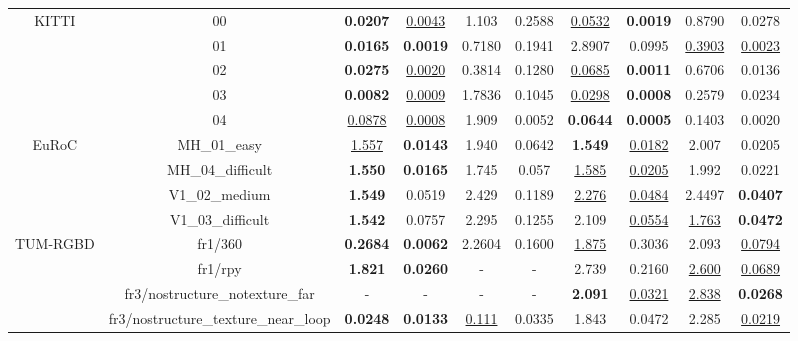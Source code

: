 \begin{table*}[ht!]
{\begin{tabular}{cccccccccc}
\multirow{4}{*}{KITTI \cite{dataset:kitti}} 
                                & 00       & \textbf{0.0207} & \underline{0.0043} & 1.103 & 0.2588 & \underline{0.0532} & \textbf{0.0019} & 0.8790 & 0.0278 \\
                                & 01       & \textbf{0.0165} & \textbf{0.0019} & 0.7180 & 0.1941   & 2.8907  & 0.0995 & \underline{0.3903} & \underline{0.0023}  \\
                                & 02       & \textbf{0.0275} & \underline{0.0020}  &  0.3814  & 0.1280   & \underline{0.0685}  & \textbf{0.0011} & 0.6706  & 0.0136  \\
                                & 03       & \textbf{0.0082} & \underline{0.0009}    & 1.7836 & 0.1045   & \underline{0.0298}  & \textbf{0.0008} & 0.2579  & 0.0234  \\
                                & 04       & \underline{0.0878} & \underline{0.0008}    &  1.909  & 0.0052   & \textbf{0.0644}  & \textbf{0.0005} & 0.1403 & 0.0020  \\
\midrule
\multirow{4}{*}{EuRoC \cite{dataset:burri2016euroc}} 
                                & MH\_01\_easy       & \underline{1.557} & \textbf{0.0143} &  1.940  & 0.0642 & \textbf{1.549}  & \underline{0.0182} & 2.007  & 0.0205  \\
                                & MH\_04\_difficult  & \textbf{1.550} & \textbf{0.0165}  &  1.745  & 0.057  & \underline{1.585}  & \underline{0.0205} & 1.992  & 0.0221  \\
                                & V1\_02\_medium     & \textbf{1.549} & 0.0519  &  2.429  & 0.1189  & \underline{2.276}  & \underline{0.0484} & 2.4497  & \textbf{0.0407} \\
                                & V1\_03\_difficult  & \textbf{1.542} & 0.0757  &  2.295  & 0.1255   & 2.109  & \underline{0.0554} & \underline{1.763}  & \textbf{0.0472}  \\
\midrule
\multirow{4}{*}{TUM-RGBD \cite{sturm2012tumrgbd}} 
                                & fr1/360                               & \textbf{0.2684} & \textbf{0.0062}  &  2.2604  & 0.1600 & \underline{1.875}  & 0.3036 & 2.093  & \underline{0.0794}  \\
                                & fr1/rpy                               & \textbf{1.821} & \textbf{0.0260} &  - & - & 2.739 & 0.2160 & \underline{2.600} & \underline{0.0689}  \\
                                & fr3/nostructure\_notexture\_far       & -      & -       & -      & -     & \textbf{2.091}  & \underline{0.0321} & \underline{2.838}  & \textbf{0.0268} \\
                                & fr3/nostructure\_texture\_near\_loop  & \textbf{0.0248} & \textbf{0.0133} &  \underline{0.111}  & 0.0335  & 1.843  & 0.0472 & 2.285  & \underline{0.0219} \\


\end{tabular}}
\end{table*}
